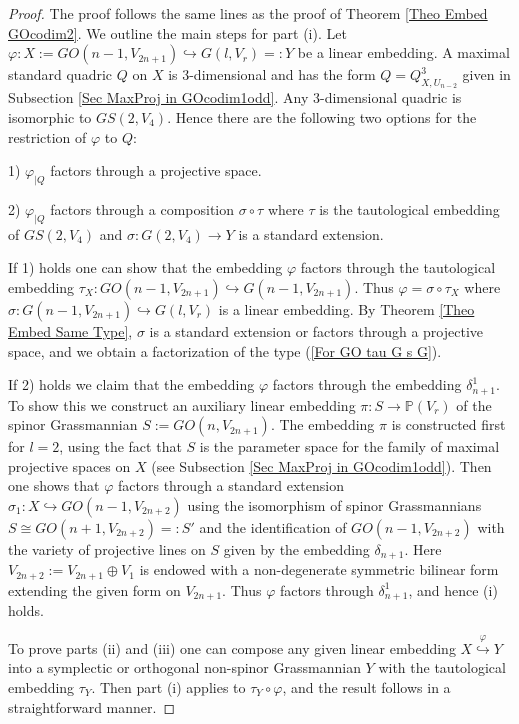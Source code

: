 \documentclass[12pt]{amsart}
\def\PP {{\mathbb P}}     %
\def\hw  {\hookrightarrow}
\begin{document}
\begin{proof}
The proof follows the same lines as the proof of Theorem \ref{Theo Embed GOcodim2}. We outline the main steps for part (i). Let $\varphi:X:=GO(n-1,V_{2n+1}) \hw G(l,V_r)=:Y$ be a linear embedding. A maximal standard quadric $Q$ on $X$ is 3-dimensional and has the form $Q=Q^3_{X,U_{n-2}}$ given in Subsection \ref{Sec MaxProj in GOcodim1odd}. Any 3-dimensional quadric is isomorphic to $GS(2,V_4)$. Hence there are the following two options for the restriction of $\varphi$ to $Q$:

1) $\varphi_{\vert Q}$ factors through a projective space.

2) $\varphi_{\vert Q}$ factors through a composition $\sigma\circ \tau$ where $\tau$ is the tautological embedding of $GS(2,V_4)$ and $\sigma: G(2,V_4)\to Y$ is a standard extension.

If 1) holds one can show that the embedding $\varphi$ factors through the tautological embedding $\tau_X:GO(n-1,V_{2n+1})\hw G(n-1,V_{2n+1})$. Thus $\varphi=\sigma\circ\tau_X$ where $\sigma:G(n-1,V_{2n+1})\hw G(l,V_r)$ is a linear embedding. By Theorem \ref{Theo Embed Same Type}, $\sigma$ is a standard extension or factors through a projective space, and we obtain a factorization of the type (\ref{For GO tau G s G}).

If 2) holds we claim that the embedding $\varphi$ factors through the embedding $\delta^1_{n+1}$. To show this we construct an auxiliary linear embedding $\pi:S\to \PP(V_r)$ of the spinor Grassmannian $S:=GO(n,V_{2n+1})$. The embedding $\pi$ is constructed first for $l=2$, using the fact that $S$ is the parameter space for the family of maximal projective spaces on $X$ (see Subsection \ref{Sec MaxProj in GOcodim1odd}). Then one shows that $\varphi$ factors through a standard extension $\sigma_1:X\hw GO(n-1,V_{2n+2})$ using the isomorphism of spinor Grassmannians $S\cong GO(n+1,V_{2n+2})=:S'$ and the identification of $GO(n-1,V_{2n+2})$ with the variety of projective lines on $S$ given by the embedding $\delta_{n+1}$. Here $V_{2n+2}:=V_{2n+1}\oplus V_1$ is endowed with a non-degenerate symmetric bilinear form extending the given form on $V_{2n+1}$. Thus $\varphi$ factors through $\delta^1_{n+1}$, and hence (i) holds.

To prove parts (ii) and (iii) one can compose any given linear embedding $X\stackrel{\varphi}{\hw} Y$ into a symplectic or orthogonal non-spinor Grassmannian $Y$ with the tautological embedding $\tau_Y$. Then part (i) applies to $\tau_Y\circ \varphi$, and the result follows in a straightforward manner.
\end{proof}
\end{document}
